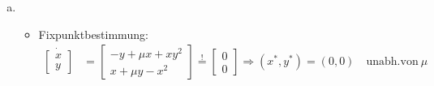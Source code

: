 \documentclass[11pt,a4paper]{article}
\begin{document}



\begin{loes}
 \begin{enumerate}[a)]
\item \begin{itemize} \item Fixpunktbestimmung: \begin{align*} \dot{\begin{bmatrix} x \\ y\end{bmatrix}} &= \begin{bmatrix} -y + \mu x +xy^2 \\ x + \mu y - x^2\end{bmatrix}\stackrel{!}{=} \begin{bmatrix} 0 \\ 0\end{bmatrix} \Rightarrow (x^*,y^*) = (0,0) \quad \mathrm{unabh. von}\ \mu \end{align*}

\end{itemize}
\end{enumerate}
\end{loes}
\end{document}
